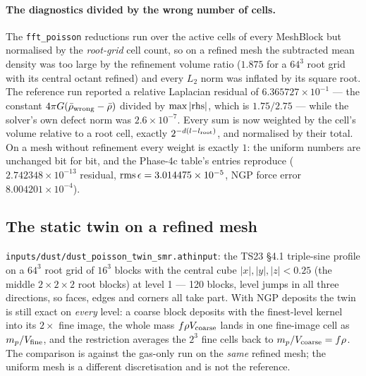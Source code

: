 \documentclass[11pt]{article}
\newcommand{\code}[1]{\texttt{#1}}
\newcommand{\file}[1]{\texttt{#1}}
\begin{document}
\paragraph{The diagnostics divided by the wrong number of cells.} The \code{fft\_poisson}
reductions run over the active cells of every MeshBlock but normalised by the
\emph{root-grid} cell count, so on a refined mesh the subtracted mean density was too
large by the refinement volume ratio ($1.875$ for a $64^3$ root grid with its central
octant refined) and every $L_2$ norm was inflated by its square root. The reference run
reported a relative Laplacian residual of $6.365727\times10^{-1}$ --- the constant
$4\pi G(\bar\rho_{\rm wrong} - \bar\rho)$ divided by $\max|{\rm rhs}|$, which is
$1.75/2.75$ --- while the solver's own defect norm was $2.6\times10^{-7}$. Every sum is
now weighted by the cell's volume relative to a root cell, exactly $2^{-d(l-l_{\rm
root})}$, and normalised by their total. On a mesh without refinement every weight is
exactly $1$: the uniform numbers are unchanged bit for bit, and the Phase-4c table's
entries reproduce ($2.742348\times10^{-13}$ residual, ${\rm rms}\,\epsilon =
3.014475\times10^{-5}$, NGP force error $8.004201\times10^{-4}$).

\subsection{The static twin on a refined mesh}

\file{inputs/dust/dust\_poisson\_twin\_smr.athinput}: the TS23 \S4.1 triple-sine profile
on a $64^3$ root grid of $16^3$ blocks with the central cube $|x|,|y|,|z| < 0.25$ (the
middle $2\times2\times2$ root blocks) at level 1 --- 120 blocks, level jumps in all three
directions, so faces, edges and corners all take part. With NGP deposits the twin is
still exact on \emph{every} level: a coarse block deposits with the finest-level kernel
into its $2\times$ fine image, the whole mass $f\rho V_{\rm coarse}$ lands in one
fine-image cell as $m_p/V_{\rm fine}$, and the restriction averages the $2^3$ fine cells
back to $m_p/V_{\rm coarse} = f\rho$. The comparison is against the gas-only run on the
\emph{same} refined mesh; the uniform mesh is a different discretisation and is not the
reference.
\end{document}
